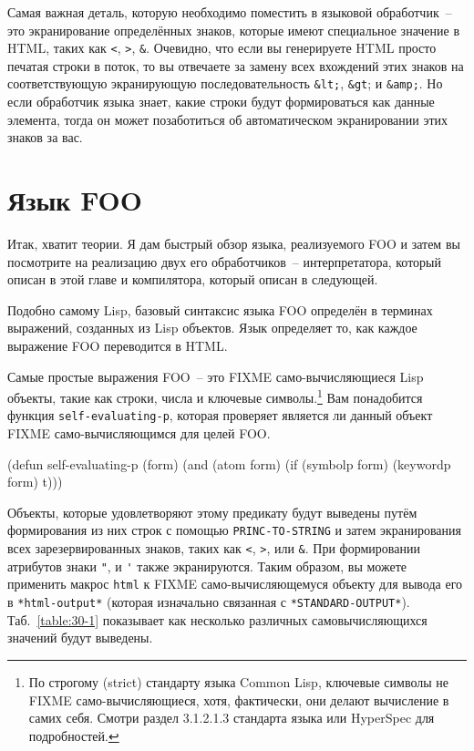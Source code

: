 Самая важная деталь, которую необходимо поместить в языковой обработчик~-- это
экранирование определённых знаков, которые имеют специальное значение в HTML, таких как
\lstinline{<}, \lstinline{>}, \lstinline!&!. Очевидно, что если вы генерируете HTML просто печатая
строки в поток, то вы отвечаете за замену всех вхождений этих знаков на соответствующую
экранирующую последовательность \lstinline!&lt;!, \lstinline!&gt!; и \lstinline!&amp;!. Но
если обработчик языка знает, какие строки будут формироваться как данные элемента, тогда
он может позаботиться об автоматическом экранировании этих знаков за вас.

\section{Язык FOO}

Итак, хватит теории. Я дам быстрый обзор языка, реализуемого FOO и затем вы посмотрите на
реализацию двух его обработчиков~-- интерпретатора, который описан в этой главе и
компилятора, который описан в следующей.

Подобно самому Lisp, базовый синтаксис языка FOO определён в терминах выражений, созданных
из Lisp объектов. Язык определяет то, как каждое выражение FOO переводится в HTML.

Самые простые выражения FOO~-- это FIXME само-вычисляющиеся Lisp объекты, такие как
строки, числа и ключевые символы.\footnote{По строгому (strict) стандарту языка Common
  Lisp, ключевые символы не FIXME само-вычисляющиеся, хотя, фактически, они делают
  вычисление в самих себя. Смотри раздел 3.1.2.1.3 стандарта языка или HyperSpec для
  подробностей.} Вам понадобится функция \lstinline{self-evaluating-p}, которая проверяет
является ли данный объект FIXME само-вычисляющимся для целей FOO.

\begin{myverb}
(defun self-evaluating-p (form)
  (and (atom form) (if (symbolp form) (keywordp form) t)))
\end{myverb}

Объекты, которые удовлетворяют этому предикату будут выведены путём формирования из них
строк с помощью \lstinline{PRINC-TO-STRING} и затем экранирования всех зарезервированных
знаков, таких как \lstinline{<}, \lstinline{>}, или \lstinline!&!. При формировании атрибутов знаки
\lstinline!"!, и \lstinline!'! также экранируются. Таким образом, вы можете применить
макрос \lstinline{html} к FIXME само-вычисляющемуся объекту для вывода его в
\lstinline{*html-output*} (которая изначально связанная с
\lstinline{*STANDARD-OUTPUT*}). Таб.~\ref{table:30-1} показывает как несколько различных
самовычисляющихся значений будут выведены.


